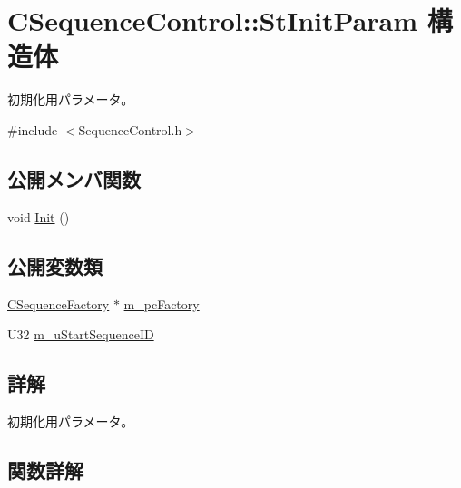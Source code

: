\hypertarget{struct_c_sequence_control_1_1_st_init_param}{}\section{C\+Sequence\+Control\+:\+:St\+Init\+Param 構造体}
\label{struct_c_sequence_control_1_1_st_init_param}


初期化用パラメータ。  




{\ttfamily \#include $<$Sequence\+Control.\+h$>$}

\subsection*{公開メンバ関数}
\begin{DoxyCompactItemize}
\item 
void \hyperlink{struct_c_sequence_control_1_1_st_init_param_ac78120d0e0fff4af4ab3064075f5aa48}{Init} ()
\end{DoxyCompactItemize}
\subsection*{公開変数類}
\begin{DoxyCompactItemize}
\item 
\hyperlink{class_c_sequence_factory}{C\+Sequence\+Factory} $\ast$ \hyperlink{struct_c_sequence_control_1_1_st_init_param_a5fcdc43e943f186741624231c1654729}{m\+\_\+pc\+Factory}
\item 
U32 \hyperlink{struct_c_sequence_control_1_1_st_init_param_ab4a70a436bf47c2c5b9b68148a5da8c8}{m\+\_\+u\+Start\+Sequence\+I\+D}
\end{DoxyCompactItemize}


\subsection{詳解}
初期化用パラメータ。 

\subsection{関数詳解}
\hypertarget{struct_c_sequence_control_1_1_st_init_param_ac78120d0e0fff4af4ab3064075f5aa48}{}
